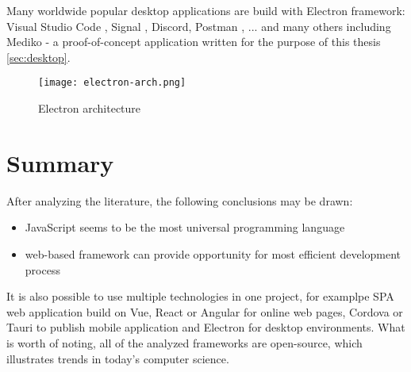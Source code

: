 Many worldwide popular desktop applications are build with Electron framework: Visual Studio Code \autocite{Vscode}, Signal \autocite{Signal}, Discord, Postman \autocite{Postman}, ... and many others including Mediko - a proof-of-concept application written for the purpose of this thesis \ref{sec:desktop}.

\begin{figure}[H]
    \centering
    \texttt{[image: electron-arch.png]}
    \caption[Electron architecture]{\label{fig:electronarch} Electron architecture \autocite{ElectronArch} }
\end{figure}



\section{{Summary}}%
\label{sec:literature_summary}

After analyzing the literature, the following conclusions may be drawn:
\begin{itemize}
    \item JavaScript seems to be the most universal programming language
    \item web-based framework can provide opportunity for most efficient development process
\end{itemize}

It is also possible to use multiple technologies in one project, for examplpe SPA web application build on Vue, React or Angular for online web pages, Cordova or Tauri to publish mobile application and Electron for desktop environments. 
What is worth of noting, all of the analyzed frameworks are open-source, which illustrates trends in today's computer science.


